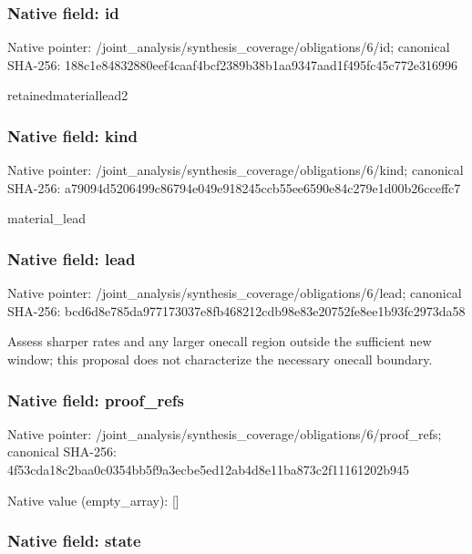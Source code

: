 \documentclass[10pt,a4paper]{article}
\begin{document}
\subsubsection{Native field: id}


Native pointer: /joint\_analysis/synthesi\allowbreak{}s\_coverage/obligations/6\allowbreak{}/id; canonical SHA-256: 188c1e84832880eef4caaf4b\allowbreak{}cf2389b38b1aa9347aad1f49\allowbreak{}5fc45c772e316996


retainedmateriallead2


\subsubsection{Native field: kind}


Native pointer: /joint\_analysis/synthesi\allowbreak{}s\_coverage/obligations/6\allowbreak{}/kind; canonical SHA-256: a79094d5206499c86794e049\allowbreak{}e918245ccb55ee6590e84c27\allowbreak{}9e1d00b26cceffc7


material\_lead


\subsubsection{Native field: lead}


Native pointer: /joint\_analysis/synthesi\allowbreak{}s\_coverage/obligations/6\allowbreak{}/lead; canonical SHA-256: bcd6d8e785da977173037e8f\allowbreak{}b468212cdb98e83e20752fe8\allowbreak{}ee1b93fc2973da58


Assess sharper rates and any larger onecall region outside the sufficient new window; this proposal does not characterize the necessary onecall boundary.


\subsubsection{Native field: proof\_refs}


Native pointer: /joint\_analysis/synthesi\allowbreak{}s\_coverage/obligations/6\allowbreak{}/proof\_refs; canonical SHA-256: 4f53cda18c2baa0c0354bb5f\allowbreak{}9a3ecbe5ed12ab4d8e11ba87\allowbreak{}3c2f11161202b945



Native value (empty\_array): []



\subsubsection{Native field: state}
\end{document}
